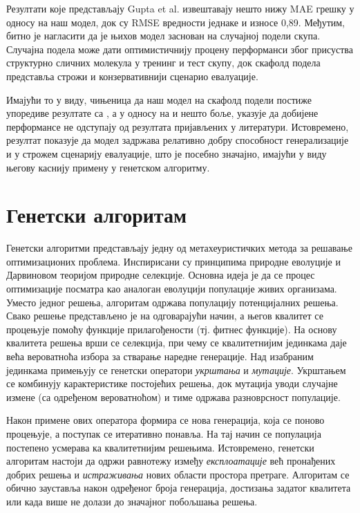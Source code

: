 \documentclass[12pt,oneside]{memoir}
\begin{document}
Резултати које представљају Gupta et al. извештавају нешто 
нижу MAE грешку у односу на наш модел, док су RMSE вредности једнаке и 
износе 0,89. Међутим, битно је нагласити да је њихов модел заснован на
случајној подели скупа. 
Случајна подела може дати оптимистичнију процену перформанси због 
присуства структурно сличних молекула у тренинг и тест скупу, док скафолд 
подела представља строжи и конзервативнији сценарио евалуације. 

Имајући то у виду, чињеница да наш модел на скафолд подели постиже упоредиве резултате 
са \cite{Gupta2025}, а у односу на \cite{Akinnusi2026} и нешто боље, указује да 
добијене перформансе не одступају од резултата пријављених у литератури. 
Истовремено, резултат показује да модел задржава релативно добру 
способност генерализације и у строжем сценарију евалуације, што је 
посебно значајно, имајући у виду његову каснију примену у генетском алгоритму.

\chapter{Генетски алгоритам}
\label{chp:genetic-algorithm}

Генетски алгоритми представљају једну од метахеуристичких метода за решавање оптимизационих проблема.
Инспирисани су принципима природне еволуције и Дарвиновом теоријом природне селекције. Основна идеја 
је да се процес оптимизације посматра као аналоган еволуцији популације живих организама. Уместо 
једног решења, алгоритам одржава популацију потенцијалних решења. Свако решење представљено је на 
одговарајући начин, а његов квалитет се процењује помоћу функције прилагођености (тј. фитнес функције). На основу квалитета решења 
врши се селекција, при чему се квалитетнијим јединкама даје већа вероватноћа избора за стварање 
наредне генерације. Над изабраним јединкама примењују се генетски оператори \textit{укрштања} и \textit{мутације}. 
Укрштањем се комбинују карактеристике постојећих решења, док мутација уводи случајне измене (са одређеном
вероватноћом) и тиме одржава разноврсност популације.

Након примене ових оператора формира се нова генерација, која се поново процењује, а поступак се 
итеративно понавља. На тај начин се популација постепено усмерава ка квалитетнијим решењима. 
Истовремено, генетски алгоритам настоји да одржи равнотежу између \textit{експлоатације} већ 
пронађених добрих решења и \textit{истраживања} нових области простора претраге. Алгоритам се 
обично зауставља након одређеног броја генерација, достизања задатог квалитета или када више не 
долази до значајног побољшања решења.
\end{document}
